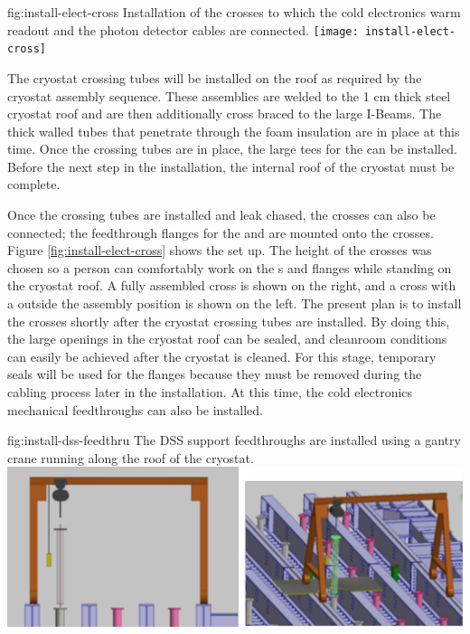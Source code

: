 \begin{dunefigure}{fig:install-elect-cross}
  {Installation of the crosses to which the cold electronics warm readout and the photon detector cables are connected.}
 \texttt{[image: install-elect-cross]}
\end{dunefigure}

The cryostat crossing tubes will be installed on the roof as required by the cryostat assembly sequence. 
These assemblies are welded to the 1 \si{cm} thick steel cryostat roof and are then additionally cross braced to the large I-Beams. 
The thick walled tubes that penetrate through the foam insulation are in place at this time. 
Once the crossing tubes are in place, the large tees for the  can be installed. 
Before the next step in the installation, the internal roof of the cryostat must be complete. 



Once the crossing tubes are installed and leak chased, the crosses can also be connected; the feedthrough flanges for the  and  are mounted onto the crosses. Figure \ref{fig:install-elect-cross} shows the set up. 
The height of the crosses was chosen so a person can comfortably work on the s  and  flanges while standing on the cryostat roof. 
A fully assembled cross is shown on the right, and a cross with a  outside the assembly position is shown on the left. 
The present plan is to install the crosses shortly after the cryostat crossing tubes are installed. 
By doing this, the large openings in the cryostat roof can be sealed, and cleanroom conditions can easily be achieved after the cryostat is cleaned. 
For this stage, temporary seals will be used for the flanges because they must be removed during the cabling process later in the installation. At this time, the cold electronics mechanical feedthroughs can also be installed. 

\begin{dunefigure}{fig:install-dss-feedthru}
  {The DSS support feedthroughs are installed using a gantry crane running along the roof of the cryostat.}
 \includegraphics[width=.95\textwidth]{graphics/dss-feedthru-install.pdf}
\end{dunefigure}


